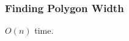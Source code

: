 \subsubsection{Finding Polygon Width}
\label{sssec:finding_polygon_width}


\begin{complexity}
\label{comp:finding_polygon_width}
$O(n)$ time.
\end{complexity}

